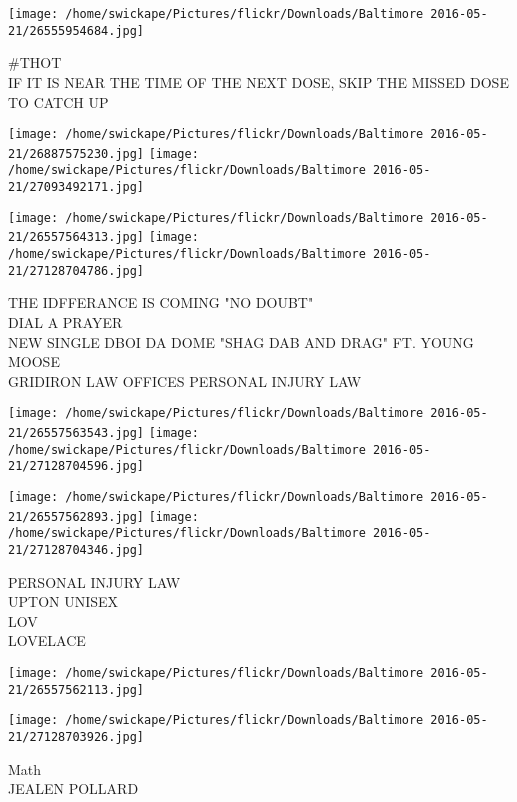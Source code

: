 \documentclass[10pt,letterpaper]{article}
\begin{document}
\vspace{0.25in}
\texttt{[image: /home/swickape/Pictures/flickr/Downloads/Baltimore 2016-05-21/26555954684.jpg]}

\#THOT\\
IF IT IS NEAR THE TIME OF THE NEXT DOSE, SKIP THE MISSED DOSE TO CATCH UP\\
\pagebreak

\texttt{[image: /home/swickape/Pictures/flickr/Downloads/Baltimore 2016-05-21/26887575230.jpg]}
\texttt{[image: /home/swickape/Pictures/flickr/Downloads/Baltimore 2016-05-21/27093492171.jpg]}

\texttt{[image: /home/swickape/Pictures/flickr/Downloads/Baltimore 2016-05-21/26557564313.jpg]}
\texttt{[image: /home/swickape/Pictures/flickr/Downloads/Baltimore 2016-05-21/27128704786.jpg]}

THE IDFFERANCE IS COMING "NO DOUBT"\\
DIAL A PRAYER\\
NEW SINGLE DBOI DA DOME "SHAG DAB AND DRAG" FT. YOUNG MOOSE\\
GRIDIRON LAW OFFICES PERSONAL INJURY LAW\\
\pagebreak

\texttt{[image: /home/swickape/Pictures/flickr/Downloads/Baltimore 2016-05-21/26557563543.jpg]}
\texttt{[image: /home/swickape/Pictures/flickr/Downloads/Baltimore 2016-05-21/27128704596.jpg]}

\texttt{[image: /home/swickape/Pictures/flickr/Downloads/Baltimore 2016-05-21/26557562893.jpg]}
\texttt{[image: /home/swickape/Pictures/flickr/Downloads/Baltimore 2016-05-21/27128704346.jpg]}

PERSONAL INJURY LAW\\
UPTON UNISEX\\
LOV\\
LOVELACE\\
\pagebreak

\texttt{[image: /home/swickape/Pictures/flickr/Downloads/Baltimore 2016-05-21/26557562113.jpg]}

\vspace{0.25in}
\texttt{[image: /home/swickape/Pictures/flickr/Downloads/Baltimore 2016-05-21/27128703926.jpg]}

Math\\
JEALEN POLLARD\\
\pagebreak
\end{document}
